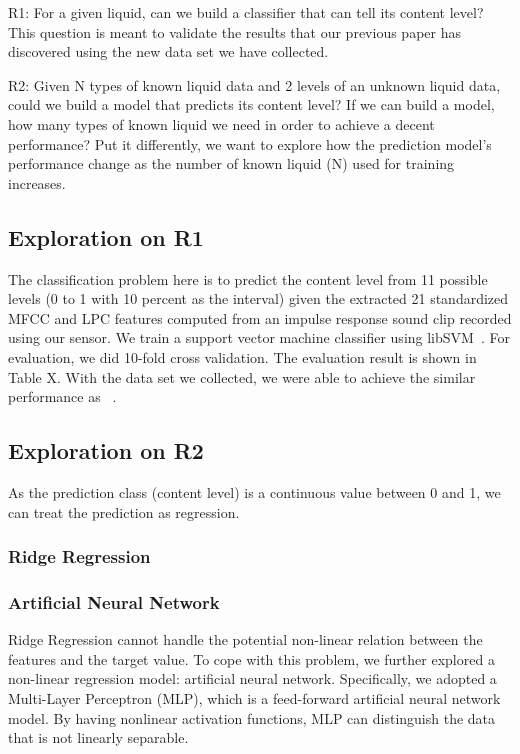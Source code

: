\documentclass{article} %
\begin{document}
R1: For a given liquid, can we build a classifier that can tell its content level? This question is meant to validate the results that our previous paper has discovered using the new data set we have collected.

R2: Given N types of known liquid data and 2 levels of an unknown liquid data, could we build a model that predicts its content level? If we can build a model, how many types of known liquid we need in order to achieve a decent performance? Put it differently, we want to explore how the prediction model's performance change as the number of known liquid (N) used for training increases. 


\subsection{Exploration on R1}
The classification problem here is to predict the content level from 11 possible levels (0 to 1 with 10 percent as the interval) given the extracted 21 standardized MFCC and LPC features computed from an impulse response sound clip recorded using our sensor. We train a support vector machine classifier using libSVM~\cite{chang2011libsvm}. For evaluation, we did 10-fold cross validation. The evaluation result is shown in Table X. With the data set we collected, we were able to achieve the similar performance as ~\cite{fan2015soqr}. 

\subsection{Exploration on R2}
As the prediction class (content level) is a continuous value between 0 and 1, we can treat the prediction as regression.
  
\subsubsection{Ridge Regression}

\subsubsection{Artificial Neural Network}
Ridge Regression cannot handle the potential non-linear relation between the features and the target value. To cope with this problem, we further explored a non-linear regression model: artificial neural network. Specifically, we adopted a Multi-Layer Perceptron (MLP), which is a feed-forward artificial neural network model. By having nonlinear activation functions, MLP can distinguish the data that is not linearly separable. 
\end{document}
